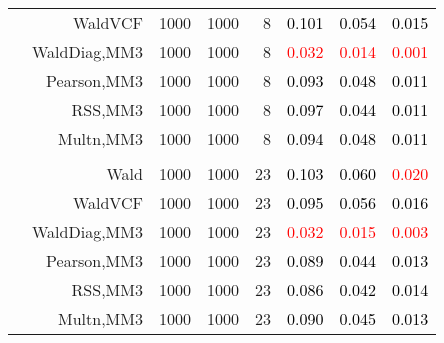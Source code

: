 \documentclass[
]{article}
\begin{document}
\begin{table}[H]
{\begin{tabular}[t]{lrrrrrrr}
\hspace{1em} & WaldVCF & 1000 & 1000 & 8 & \textcolor{black}{0.101} & \textcolor{black}{0.054} & \textcolor{black}{0.015}\\

\hspace{1em} & WaldDiag,MM3 & 1000 & 1000 & 8 & \textcolor{red}{0.032} & \textcolor{red}{0.014} & \textcolor{red}{0.001}\\

\hspace{1em} & Pearson,MM3 & 1000 & 1000 & 8 & \textcolor{black}{0.093} & \textcolor{black}{0.048} & \textcolor{black}{0.011}\\

\hspace{1em} & RSS,MM3 & 1000 & 1000 & 8 & \textcolor{black}{0.097} & \textcolor{black}{0.044} & \textcolor{black}{0.011}\\

\hspace{1em} & Multn,MM3 & 1000 & 1000 & 8 & \textcolor{black}{0.094} & \textcolor{black}{0.048} & \textcolor{black}{0.011}\\
\cmidrule{1-8}
\addlinespace[0.3em]
\multicolumn{8}{l}{\textbf{3F 15V}}\\
\hspace{1em} & Wald & 1000 & 1000 & 23 & \textcolor{black}{0.103} & \textcolor{black}{0.060} & \textcolor{red}{0.020}\\

\hspace{1em} & WaldVCF & 1000 & 1000 & 23 & \textcolor{black}{0.095} & \textcolor{black}{0.056} & \textcolor{black}{0.016}\\

\hspace{1em} & WaldDiag,MM3 & 1000 & 1000 & 23 & \textcolor{red}{0.032} & \textcolor{red}{0.015} & \textcolor{red}{0.003}\\

\hspace{1em} & Pearson,MM3 & 1000 & 1000 & 23 & \textcolor{black}{0.089} & \textcolor{black}{0.044} & \textcolor{black}{0.013}\\

\hspace{1em} & RSS,MM3 & 1000 & 1000 & 23 & \textcolor{black}{0.086} & \textcolor{black}{0.042} & \textcolor{black}{0.014}\\

\hspace{1em} & Multn,MM3 & 1000 & 1000 & 23 & \textcolor{black}{0.090} & \textcolor{black}{0.045} & \textcolor{black}{0.013}\\
\bottomrule
\end{tabular}}
\endgroup{}
\end{table}
\end{document}
